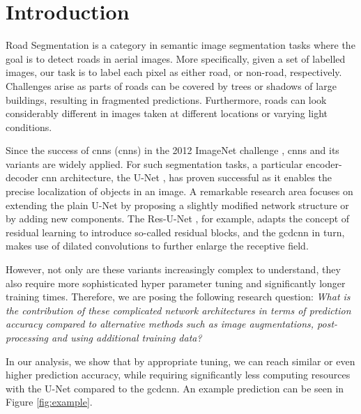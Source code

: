 \section{Introduction}
Road Segmentation is a category in semantic image segmentation tasks where the goal is to detect roads in aerial images. More specifically, given a set of labelled images, our task is to label each pixel as either road, or non-road, respectively. Challenges arise as parts of roads can be covered by trees or shadows of large buildings, resulting in fragmented predictions. Furthermore, roads can look considerably different in images taken at different locations or varying light conditions.

Since the success of \acrlong{cnn}s (\acrshort{cnn}s) in the 2012 ImageNet challenge \cite{imagenet}, \acrshort{cnn}s and its variants are widely applied. For such segmentation tasks, a particular encoder-decoder \acrshort{cnn} architecture, the U-Net \cite{unet}, has proven successful as it enables the precise localization of objects in an image. A remarkable research area focuses on extending the plain U-Net by proposing a slightly modified network structure or by adding new components. The Res-U-Net \cite{resunet}, for example, adapts the concept of residual learning \cite{residual} to introduce so-called residual blocks, and the \acrfull{gcdcnn} \cite{gcdcnn} in turn, makes use of dilated convolutions to further enlarge the receptive field.

However, not only are these variants increasingly complex to understand, they also require more sophisticated hyper parameter tuning and significantly longer training times. Therefore, we are posing the following research question: \emph{What is the contribution of these complicated network architectures in terms of prediction accuracy compared to alternative methods such as image augmentations, post-processing and using additional training data?}


In our analysis, we show that by appropriate tuning, we can reach similar or even higher prediction accuracy, while requiring significantly less computing resources with the U-Net compared to the \acrshort{gcdcnn}. An example prediction can be seen in Figure \ref{fig:example}.

